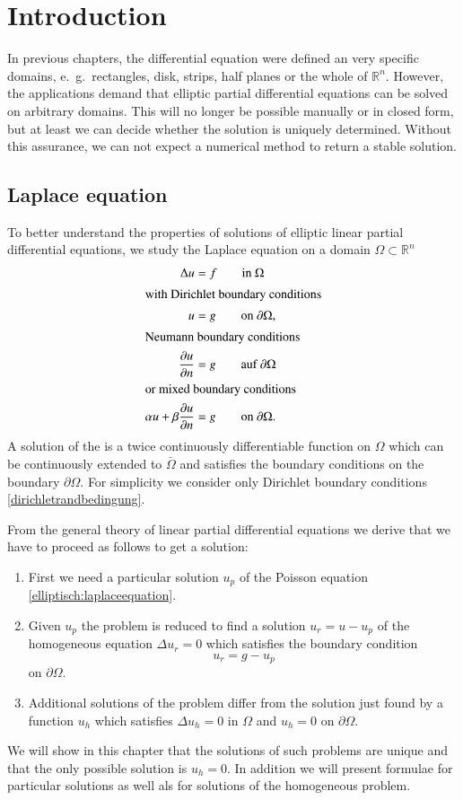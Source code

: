 %
%
%
\section{Introduction}
In previous chapters, the differential equation were defined an
very specific domains, e.~g.~rectangles, disk, strips, half planes or
the whole of $\mathbb R^n$.
However, the applications demand that elliptic partial differential
equations can be solved on arbitrary domains.
This will no longer be possible manually or in closed form, but at
least we can decide whether the solution is uniquely determined.
Without this assurance, we can not expect a numerical method to
return a stable solution.

\subsection{Laplace equation}
To better understand the properties of solutions of elliptic linear
partial differential equations, we study the Laplace equation
on a domain $\Omega\subset\mathbb R^n$
\begin{align}
\Delta u&=f \qquad\text{in $\Omega$}
\label{elliptisch:laplaceequation}
\\
\intertext{with Dirichlet boundary conditions}
u&=g \qquad \text{on $\partial\Omega$},
\label{dirichletrandbedingung}
\\
\intertext{Neumann boundary conditions}
\frac{\partial u}{\partial n}&=g \qquad \text{auf $\partial\Omega$}
\\
\intertext{or mixed boundary conditions}
\alpha u + \beta\frac{\partial u}{\partial n}&=g \qquad \text{on $\partial\Omega$.}
\label{elliptisch:gemischt}
\end{align}
A solution of the is a twice continuously differentiable function
on $\Omega$ which can be continuously extended to $\bar\Omega$
and satisfies the boundary conditions on the boundary $\partial\Omega$.
For simplicity we consider only Dirichlet boundary conditions
\eqref{dirichletrandbedingung}.

From the general theory of linear partial differential equations
we derive that we have to proceed as follows to get a solution:
\begin{enumerate}
\item
First we need a particular solution $u_p$ of the Poisson equation
\eqref{elliptisch:laplaceequation}.
\item
Given $u_p$ the problem is reduced to find a solution
$u_r=u-u_p$ of the homogeneous equation $\Delta u_r=0$ which
satisfies the boundary condition
\[
u_r=g-u_p
\]
on $\partial\Omega$.
\item
Additional solutions of the problem differ from the solution
just found by a function $u_h$ which satisfies
$\Delta u_h=0$ in $\Omega$ and $u_h=0$ on $\partial\Omega$.
\end{enumerate}
We will show in this chapter that the solutions of such problems
are unique and that the only possible solution is $u_h=0$.
In addition we will present formulae for particular solutions as well
als for solutions of the homogeneous problem.

